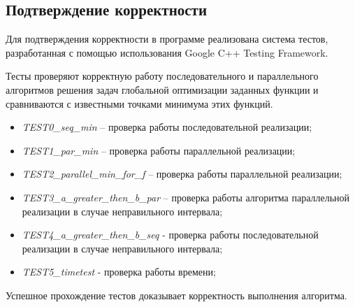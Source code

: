 \documentclass[a4paper]{report}
\begin{document}
\begin{center}
\section*{Подтверждение корректности}
\end{center}
\par Для подтверждения корректности в программе реализована система тестов, разработанная с помощью использования Google C++ Testing Framework.
\par Тесты проверяют корректную работу последовательного и параллельного алгоритмов решения задач глобальной оптимизации заданных функции и сравниваются с известными точками минимума этих функций.
\begin{itemize}
\item\textit{TEST0\_seq\_min} – проверка работы последовательной реализации;
\item\textit{TEST1\_par\_min} – проверка работы параллельной реализации;
\item\textit{TEST2\_parallel\_min\_for\_f} – проверка работы параллельной реализации;
\item\textit{TEST3\_a\_greater\_then\_b\_par} – проверка работы алгоритма параллельной реализации в случае неправильного интервала;
\item\textit{TEST4\_a\_greater\_then\_b\_seq} - проверка работы последовательной реализации в случае неправильного интервала;
\item\textit{TEST5\_timetest} - проверка работы времени;
\end{itemize}
\par Успешное прохождение тестов доказывает корректность выполнения алгоритма.
\newpage
\end{document}
